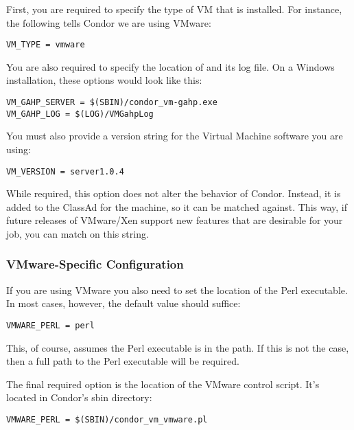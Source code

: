 First, you are required to specify the type of VM that is installed. 
For instance, the following tells Condor we are using VMware:

\begin{verbatim}
VM_TYPE = vmware
\end{verbatim}

You are also required to specify the location of  and
its log file.
On a Windows installation, these options would look like this:

\begin{verbatim}
VM_GAHP_SERVER = $(SBIN)/condor_vm-gahp.exe
VM_GAHP_LOG = $(LOG)/VMGahpLog
\end{verbatim}

You must also provide a version string for the Virtual Machine software
you are using:

\begin{verbatim}
VM_VERSION = server1.0.4
\end{verbatim}

While required, this option does not alter the behavior of Condor.
Instead, it is added to the ClassAd for the machine, so it 
can be matched against.  This way, if future releases of VMware/Xen support
new features that are desirable for your job, you can match on this string.


\subsubsection{VMware-Specific Configuration}

If you are using VMware you also need to set the location of the Perl 
executable.  In most cases, however, the default value should suffice:

\begin{verbatim}
VMWARE_PERL = perl
\end{verbatim}

This, of course, assumes the Perl executable is in the path.  If this is not 
the case, then a full path to the Perl executable will be required.

The final required option is the location of the VMware control script. It's
located in Condor's sbin directory:

\begin{verbatim}
VMWARE_PERL = $(SBIN)/condor_vm_vmware.pl
\end{verbatim}

